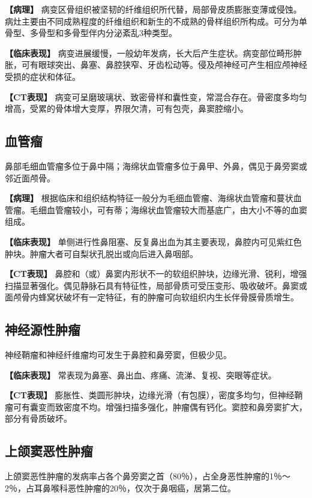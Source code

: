 \textbf{【病理】}
病变区骨组织被坚韧的纤维组织所代替，局部骨皮质膨胀变薄或侵蚀。病灶主要由不同成熟程度的纤维组织和新生的不成熟的骨样组织所构成。可分为单骨型、多骨型和多骨型伴内分泌紊乱3种类型。

\textbf{【临床表现】}
病变进展缓慢，一般幼年发病，长大后产生症状。病变部位畸形肿胀，可有眼球突出、鼻塞、鼻腔狭窄、牙齿松动等。侵及颅神经可产生相应颅神经受损的症状和体征。

\textbf{【CT表现】}
病变可呈磨玻璃状、致密骨样和囊性变，常混合存在。骨密度多均匀增高，受累的骨体增大变厚，界限欠清，可有包壳，鼻窦腔缩小。

\subsection{血管瘤}

鼻部毛细血管瘤多位于鼻中隔；海绵状血管瘤多位于鼻甲、外鼻，偶见于鼻旁窦或邻近面颅骨。

\textbf{【病理】}
根据临床和组织结构特征一般分为毛细血管瘤、海绵状血管瘤和蔓状血管瘤。毛细血管瘤较小，可有蒂；海绵状血管瘤较大而基底广，由大小不等的血窦组成。

\textbf{【临床表现】}
单侧进行性鼻阻塞、反复鼻出血为其主要表现，鼻腔内可见紫红色肿块。肿瘤大者可自梨状孔脱出或向后进入鼻咽部。

\textbf{【CT表现】}
鼻腔和（或）鼻窦内形状不一的软组织肿块，边缘光滑、锐利，增强扫描显著强化。偶见静脉石具有特征性，局部骨质可受压变形、吸收破坏。鼻窦或面颅骨内蜂窝状破坏有一定特征，有的肿瘤可向软组织内生长伴骨膜骨质增生。

\subsection{神经源性肿瘤}

神经鞘瘤和神经纤维瘤均可发生于鼻腔和鼻旁窦，但极少见。

\textbf{【临床表现】}
常表现为鼻塞、鼻出血、疼痛、流涕、复视、突眼等症状。

\textbf{【CT表现】}
膨胀性、类圆形肿块，边缘光滑（有包膜），密度多均匀，但神经鞘瘤可有囊变而致密度不均。增强扫描多强化，肿瘤偶有钙化。窦腔和鼻旁窦扩大，部分有骨质破坏。

\subsection{上颌窦恶性肿瘤}

上颌窦恶性肿瘤的发病率占各个鼻旁窦之首（80％），占全身恶性肿瘤的1％～2％，占耳鼻喉科恶性肿瘤的20％，仅次于鼻咽癌，居第二位。

